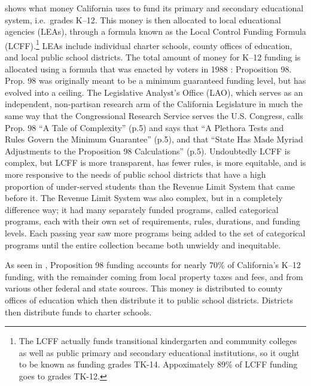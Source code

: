  shows what money California uses to fund its primary and secondary educational system, i.e.~grades K–12. This money is then allocated to local educational agencies (LEAs), through a formula known as the Local Control Funding Formula (LCFF).\footnote{The LCFF actually funds transitional kindergarten and community colleges as well as public primary and secondary educational institutions, so it ought to be known as funding grades TK-14. Appoximately 89\% of LCFF funding goes to grades TK-12.} LEAs include individual charter schools, county offices of education, and local public school districts. The total amount of money for K–12 funding is allocated using a formula that was enacted by voters in 1988 \parencite{LAO2017}: Proposition 98. Prop. 98 was originally meant to be a minimum guaranteed funding level, but has evolved into a ceiling. The Legislative Analyst's Office (LAO), which serves as an independent, non-partisan research arm of the California Legislature in much the same way that the Congressional Research Service serves the U.S. Congress, calls Prop. 98 ``A Tale of Complexity''  (p.5) and says that ``A Plethora Tests and Rules Govern the Minimum Guarantee'' (p.5), and that ``State Has Made Myriad Adjustments to the Proposition 98 Calculations'' (p.5). Undoubtedly LCFF is complex, but LCFF is more transparent, has fewer rules, is more equitable, and is more responsive to the needs of public school districts that have a high proportion of under-served students than the Revenue Limit System that came before it. The Revenue Limit System was also complex, but in a completely difference way; it had many separately funded programs, called categorical programs, each with their own set of requirements, rules, durations, and funding levels. Each passing year saw more programs being added to the set of categorical programs until the entire collection became both unwieldy and inequitable.

As seen in , Proposition 98 funding accounts for nearly 70\% of California's K–12 funding, with the remainder coming from local property taxes and fees, and from various other federal and state sources. This money is distributed to county offices of education which then distribute it to public school districts. Districts then distribute funds to charter schools.

